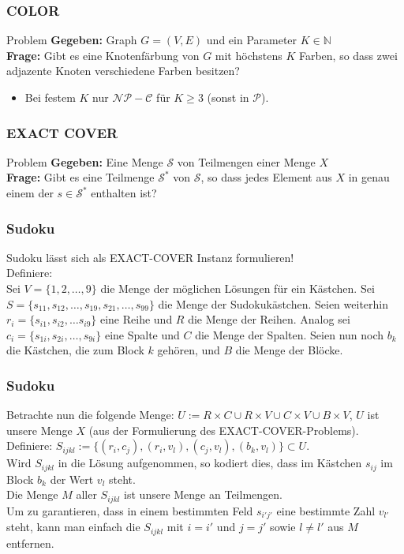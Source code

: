 \documentclass{beamer}
\begin{document}
{\begin{frame}
\frametitle{COLOR}
\begin{block}{Problem}
\textbf{Gegeben:} Graph $G = (V, E)$ und ein Parameter $K \in \mathbb{N}$\\
\textbf{Frage:} Gibt es eine Knotenfärbung von $G$ mit höchstens $K$ Farben, so dass zwei adjazente Knoten verschiedene Farben besitzen?
\end{block}
\begin{itemize}
\item Bei festem $K$ nur $\mathcal{NP-C}$ für $K \geq 3$ (sonst in $\mathcal{P}$).
\end{itemize}
\end{frame}
\begin{frame}
\frametitle{EXACT COVER}
\begin{block}{Problem}
\textbf{Gegeben:} Eine Menge $\mathcal{S}$ von Teilmengen einer Menge $X$\\
\textbf{Frage:} Gibt es eine Teilmenge $\mathcal{S}^*$ von $\mathcal{S}$, so dass jedes Element aus $X$ in genau einem der $s \in \mathcal{S}^*$ enthalten ist?
\end{block}
\end{frame}

\begin{frame}
\frametitle{Sudoku}
Sudoku lässt sich als EXACT-COVER Instanz formulieren!\\
Definiere:\\
Sei $V = \{1,2,\ldots,9\}$ die Menge der möglichen Lösungen für ein Kästchen.
Sei $S = \{s_{11}, s_{12},\ldots,s_{19},s_{21},\ldots,s_{99}\}$ die Menge der Sudokukästchen.
Seien weiterhin $r_i = \{s_{i1}, s_{i2}, \ldots s_{i9}\}$ eine Reihe und $R$ die Menge der Reihen.
Analog sei $c_i = \{s_{1i}, s_{2i}, \ldots, s_{9i}\}$ eine Spalte und $C$ die Menge der Spalten.
Seien nun noch $b_k$ die Kästchen, die zum Block $k$ gehören, und $B$ die Menge der Blöcke.
\end{frame}

\begin{frame}
\frametitle{Sudoku}
Betrachte nun die folgende Menge: $U := R \times C \cup R \times V \cup C \times V \cup B \times V$, $U$ ist unsere Menge $X$ (aus der Formulierung des EXACT-COVER-Problems).\\
Definiere: $S_{ijkl} := \{(r_i,c_j),(r_i,v_l),(c_j,v_l),(b_k,v_l)\} \subset U$.\\[8pt]
Wird $S_{ijkl}$ in die Lösung aufgenommen, so kodiert dies, dass im Kästchen $s_{ij}$ im Block $b_k$ der Wert $v_l$ steht.\\
Die Menge $M$ aller $S_{ijkl}$ ist unsere Menge an Teilmengen.\\
Um zu garantieren, dass in einem bestimmten Feld $s_{i'j'}$ eine bestimmte Zahl $v_{l'}$ steht, kann man einfach die $S_{ijkl}$ mit $i = i'$ und $j = j'$ sowie $l \neq l'$ aus $M$ entfernen.
\end{frame}

}
\end{document}
